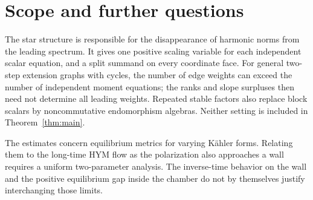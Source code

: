 \section{Scope and further questions}

The star structure is responsible for the disappearance of harmonic
norms from the leading spectrum. It gives one positive scaling
variable for each independent scalar equation, and a split summand
on every coordinate face. For general two-step extension graphs
with cycles, the number of edge weights can exceed the number of
independent moment equations; the ranks and slope surpluses then
need not determine all leading weights. Repeated stable factors
also replace block scalars by noncommutative endomorphism algebras.
Neither setting is included in Theorem~\ref{thm:main}.

The estimates concern equilibrium metrics for varying K\"ahler forms.
Relating them to the long-time HYM flow as the polarization also
approaches a wall requires a uniform two-parameter analysis. The
inverse-time behavior on the wall and the positive equilibrium gap
inside the chamber do not by themselves justify interchanging those
limits.
